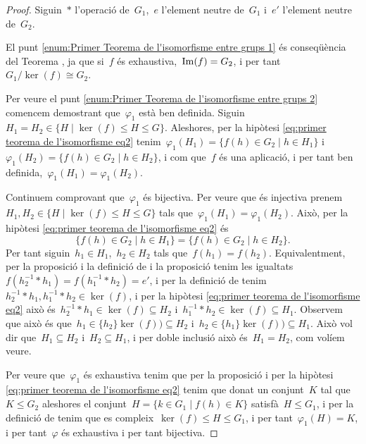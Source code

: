\documentclass[../../main.tex]{subfiles}
\begin{document}
    \begin{proof}
        Siguin~\(\ast\) l'operació de~\(G_{1}\),~\(e\) l'element neutre de~\(G_{1}\) i~\(e'\) l'element neutre de~\(G_{2}\).

        El punt \eqref{enum:Primer Teorema de l'isomorfisme entre grups 1} és conseqüència del Teorema , ja que si~\(f\) és exhaustiva,~\(\operatorname{Im}(f)=G_{2}\), i per tant~\(G_{1}/\ker(f)\cong G_{2}\).

        Per veure el punt \eqref{enum:Primer Teorema de l'isomorfisme entre grups 2} comencem demostrant que~\(\varphi_{1}\) està ben definida.
        Siguin~\(H_{1}=H_{2}\in\{H\mid\ker(f)\leq H\leq G\}\).
        Aleshores, per la hipòtesi \eqref{eq:primer teorema de l'isomorfisme eq2} tenim~\(\varphi_{1}(H_{1})=\{f(h)\in G_{2}\mid h\in H_{1}\}\) i~\(\varphi_{1}(H_{2})=\{f(h)\in G_{2}\mid h\in H_{2}\}\), i com que~\(f\) és una aplicació, i per tant ben definida,~\(\varphi_{1}(H_{1})=\varphi_{1}(H_{2})\).

        Continuem comprovant que~\(\varphi_{1}\) és bijectiva.
        Per veure que és injectiva prenem~\(H_{1},H_{2}\in\{H\mid\ker(f)\leq H\leq G\}\) tals que~\(\varphi_{1}(H_{1})=\varphi_{1}(H_{2})\).
        Això, per la hipòtesi \eqref{eq:primer teorema de l'isomorfisme eq2} és
        \[
            \{f(h)\in G_{2}\mid h\in H_{1}\}=\{f(h)\in G_{2}\mid h\in H_{2}\}.
        \]
        Per tant siguin~\(h_{1}\in H_{1}\),~\(h_{2}\in H_{2}\) tals que~\(f(h_{1})=f(h_{2})\).
        Equivalentment, per la proposició  i la definició de  i la proposició  tenim les igualtats~\(f(h_{2}^{-1}\ast h_{1})=f(h_{1}^{-1}\ast h_{2})=e'\), i per la definició de  tenim~\(h_{2}^{-1}\ast h_{1},h_{1}^{-1}\ast h_{2}\in\ker(f)\), i per la hipòtesi \eqref{eq:primer teorema de l'isomorfisme eq2} això és~\(h_{2}^{-1}\ast h_{1}\in\ker(f)\subseteq H_{2}\) i~\(h_{1}^{-1}\ast h_{2}\in\ker(f)\subseteq H_{1}\).
        Observem que això és que~\(h_{1}\in\{h_{2}\}\ker(f))\subseteq H_{2}\) i~\(h_{2}\in\{h_{1}\}\ker(f))\subseteq H_{1}\).
        Això vol dir que~\(H_{1}\subseteq H_{2}\) i~\(H_{2}\subseteq H_{1}\), i per doble inclusió això és~\(H_{1}=H_{2}\), com volíem veure.

        Per veure que~\(\varphi_{1}\) és exhaustiva tenim que per la proposició  i per la hipòtesi \eqref{eq:primer teorema de l'isomorfisme eq2} tenim que donat un conjunt~\(K\) tal que~\(K\leq G_{2}\) aleshores el conjunt~\(H=\{k\in G_{1}\mid f(h)\in K\}\) satisfà~\(H\leq G_{1}\), i per la definició de  tenim que es compleix~\(\ker(f)\leq H\leq G_{1}\), i per tant~\(\varphi_{1}(H)=K\), i per tant~\(\varphi\) és exhaustiva i per tant bijectiva.


\end{proof}
\end{document}
